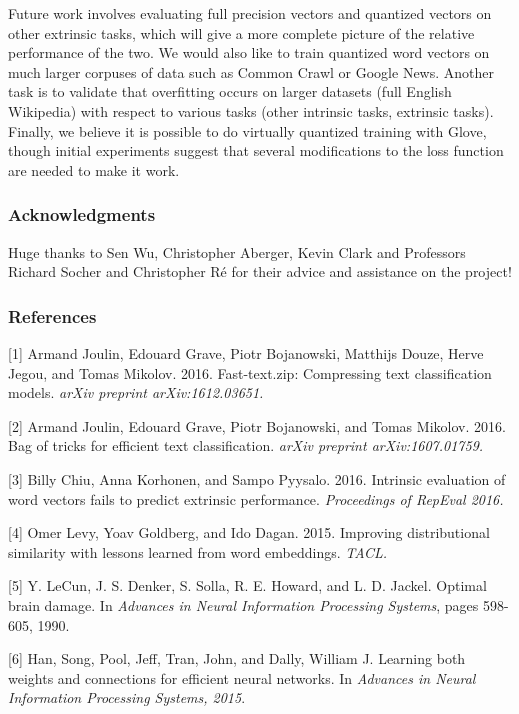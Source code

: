 \documentclass{article} %
\begin{document}
Future work involves evaluating full precision vectors and quantized
vectors on other extrinsic tasks, which will give a more complete
picture of the relative performance of the two. We would also like to
train quantized word vectors on much larger corpuses of data such as
Common Crawl or Google News. Another task is to validate that
overfitting occurs on larger datasets (full English Wikipedia) with
respect to various tasks (other intrinsic tasks, extrinsic
tasks). Finally, we believe it is possible to do virtually quantized
training with Glove, though initial experiments suggest that
several modifications to the loss function are needed to make it work.

\subsubsection*{Acknowledgments}

Huge thanks to Sen Wu, Christopher Aberger, Kevin Clark and Professors
Richard Socher and Christopher R\'e for their advice and assistance on
the project!

\subsubsection*{References}

\small{ [1] Armand Joulin, Edouard Grave, Piotr Bojanowski, Matthijs
  Douze, Herve Jegou, and Tomas Mikolov. 2016. Fast-text.zip:
  Compressing text classification models. {\it arXiv preprint
  arXiv:1612.03651.}}

\small{[2] Armand Joulin, Edouard Grave, Piotr Bojanowski, and
  Tomas Mikolov. 2016. Bag of tricks for efficient text
  classification. {\it arXiv preprint arXiv:1607.01759.}
}

\small{[3] Billy Chiu, Anna Korhonen, and Sampo Pyysalo.
  2016. Intrinsic evaluation of word vectors fails
  to predict extrinsic performance. {\it Proceedings of RepEval 2016.}
}

\small{[4] Omer Levy, Yoav Goldberg, and Ido Dagan. 2015. Improving
  distributional similarity with lessons learned from word
  embeddings. {\it TACL.}
}

\small{[5] Y. LeCun, J. S. Denker, S. Solla, R. E. Howard, and
  L. D. Jackel. Optimal brain damage. In {\it Advances in Neural
    Information Processing Systems}, pages 598-605, 1990.
}

\small{[6] Han, Song, Pool, Jeff, Tran, John, and Dally, William
  J. Learning both weights and connections for efficient neural
  networks. In {\it Advances in Neural Information Processing Systems,
  2015}.
}
\end{document}
